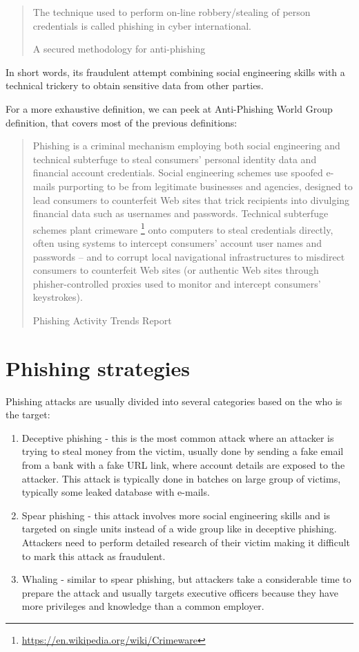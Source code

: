 \documentclass[
  digital, %
  oneside, %
  table,   %
  nolof,     %
  nolot,     %
]{fithesis3}
\begin{document}
\blockquote[A secured methodology for anti-phishing \cite{secured-methodology}][]{
\par The   technique   used   to   perform   on-line   robbery/stealing  of  person  credentials  is  called  phishing  in cyber international.
}

\par

In short words, its fraudulent attempt combining social engineering skills with a technical trickery to obtain sensitive data from other parties. 

For a more exhaustive definition, we can peek at Anti-Phishing World Group definition, that covers most of the previous definitions:

\blockquote[Phishing Activity Trends Report \cite{apwg-2019-2}][]{
Phishing is a criminal mechanism employing both social
engineering and technical subterfuge to steal consumers’
personal identity data and financial account credentials.
Social engineering schemes use spoofed e-mails
purporting to be from legitimate businesses and
agencies, designed to lead consumers to counterfeit Web
sites that trick recipients into divulging financial data
such as usernames and passwords. Technical subterfuge
schemes plant crimeware \footnote{\url{https://en.wikipedia.org/wiki/Crimeware}} onto computers to steal
credentials directly, often using systems to intercept
consumers’ account user names and passwords -- and to
corrupt local navigational infrastructures to misdirect
consumers to counterfeit Web sites (or authentic Web
sites through phisher-controlled proxies used to monitor
and intercept consumers’ keystrokes).
}



\section{Phishing strategies}

Phishing attacks are usually divided into several categories based on the who is the target:
\begin{enumerate}
    \item Deceptive phishing - this is the most common attack where an attacker is trying to steal money from the victim, usually done by sending a fake email from a bank with a fake URL link, where account details are exposed to the attacker. This attack is typically done in batches on large group of victims, typically some leaked database with e-mails.
    \item Spear phishing - this attack involves more social engineering skills and is targeted on single units instead of a wide group like in deceptive phishing. Attackers need to perform detailed research of their victim making it difficult to mark this attack as fraudulent.
    \item Whaling - similar to spear phishing, but attackers take a considerable time to prepare the attack and usually targets executive officers because they have more privileges and knowledge than a common employer.
\end{enumerate}
\end{document}
